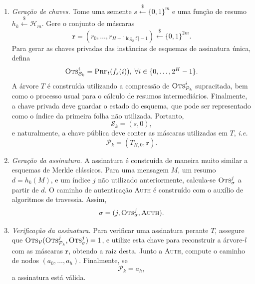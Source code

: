 \documentclass{ufsctex/ufsctex}
\newcommand{\hh}{\mathcal{H}}
\newcommand{\pk}{\mathcal{P}_k}
\newcommand{\sk}{\mathcal{S}_k}
\newcommand{\binwds}[1]{\{0, 1\}^{#1}}
\newcommand{\random}{\stackrel{\$}{\longleftarrow}}
\begin{document}
\begin{enumerate}

  \item[] \emph{Geração de chaves.} Tome uma semente $s
      \random{} \binwds{m}$ e uma função de resumo $h_k
        \random{} \hh{}_m$. Gere o conjunto de máscaras
      \begin{equation}
        \mathbf{r} = (r_0, \dots, r_{H + \lceil \log_{2} t \rceil - 1})
          \random{} \binwds{2m}.
      \end{equation}
        Para gerar as chaves privadas das instâncias de esquemas de assinatura
        única, defina
        \begin{equation}
          \textsc{Ots}_{\sk{}}^{i}
            = \textsc{Prf}_t(f_s(i)), \; \forall i \in \{0, \dots, 2^H - 1\}.
        \end{equation}
        A árvore $T$ é construída
        utilizando a compressão de $\textsc{Ots}_{\pk{}}^{i}$ supracitada, bem
        como o processo usual para o cálculo de resumos intermediários.
        Finalmente, a chave privada deve guardar o estado do esquema, que pode
        ser representado como o índice da primeira folha não utilizada.
        Portanto,
        \begin{equation}
          \sk{} = (s, 0),
        \end{equation}
        e naturalmente, a chave pública deve conter as máscaras utilizadas
        em $T$, \emph{i.e.}
        \begin{equation}
          \pk{} = (T_{H, 0}, \mathbf{r}).
        \end{equation}

  \item[] \emph{Geração da assinatura.} A assinatura é construída de maneira
      muito similar a esquemas de Merkle clássicos. Para uma mensagem $M$, um
        resumo $d = h_k(M)$, e um índice $j$ não utilizado anteriormente,
        calcula-se $\textsc{Ots}_\sigma^{j}$ a partir de $d$. O caminho de
        autenticação \textsc{Auth} é construído com o auxílio de algoritmos de
        travessia. Assim,
        \begin{equation}
          \sigma = (j, \textsc{Ots}_\sigma^{j}, \textsc{Auth}).
        \end{equation}

  \item[] \emph{Verificação da assinatura.} Para verificar uma assinatura
      perante $T$, assegure que
        $\textsc{Ots}_{\mathcal{V}}(\textsc{Ots}_{\pk{}}^{j},
        \textsc{Ots}_{\sigma}^{j}) = 1$, e utilize esta chave para reconstruir
        a árvore-$l$ com as máscaras $\mathbf{r}$, obtendo a raiz desta. Junto
        a \textsc{Auth}, compute o caminho de nodos $(a_0, \dots, a_h)$.
        Finalmente, se
      \begin{equation}
        \pk{} = a_{h},
      \end{equation}
        a assinatura está válida.

\end{enumerate}
\end{document}
